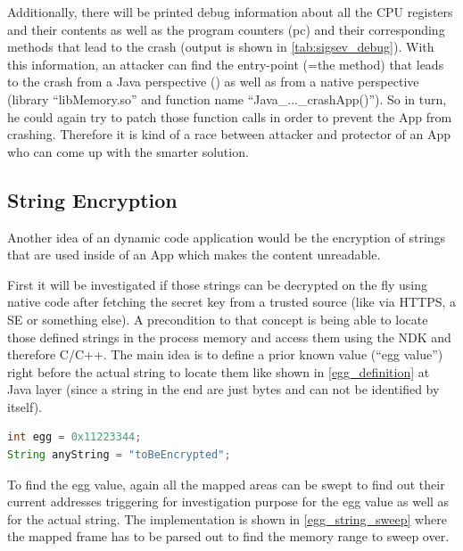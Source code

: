 Additionally, there will be printed debug information about all the CPU
registers and their contents as well as the program counters (pc) and
their corresponding methods that lead to the crash (output is shown in
\autoref{tab:sigsev_debug}). With this information, an attacker can find
the entry-point (=the method) that leads to the crash from a Java perspective
() as well as from a native perspective
(library ``libMemory.so'' and function name ``Java\_...\_crashApp()'').
So in turn, he could again try to patch
those function calls in order to prevent the App from crashing.
Therefore it is kind of a race between attacker and protector of an App who can come up with the smarter solution.

\subsection{String Encryption}
Another idea of an dynamic code application would be the encryption of strings
that are used inside of an App which makes the content unreadable.

First it will be investigated if those strings can be decrypted on the
fly using native code after fetching the secret key from a trusted source
(like via HTTPS, a SE or something else).
A precondition to that concept is being able to locate those defined strings
in the process memory and access them using the NDK and therefore C/C++.
The main idea is to define a prior known value (``egg value'') right before the actual string to locate them like shown in \autoref{egg_definition} at Java
layer (since a string in the end are just bytes and can not be identified by
itself).
\begin{lstlisting}[language=Java, caption=Egg Value Defining, label=egg_definition]
int egg = 0x11223344;
String anyString = "toBeEncrypted";
\end{lstlisting}
To find the egg value, again all the mapped areas can be swept to find
out their current addresses triggering for investigation purpose for
the egg value as well as for the actual string. The implementation is
shown in \autoref{egg_string_sweep} where the mapped frame has to be
parsed out to find the memory range to sweep over.

